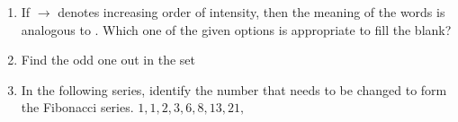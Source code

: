 \documentclass[journal]{IEEEtran}
\begin{document}
\begin{enumerate}[leftmargin=0pt]


\item
If $\rightarrow$ denotes increasing order of intensity, then the meaning of the words   is analogous to . 
Which one of the given options is appropriate to fill the blank?

\vspace{2mm}

\begin{enumerate}
\end{enumerate}

\hfill{}

\vspace{4mm}

\item
Find the odd one out in the set  

\vspace{2mm}

\begin{enumerate}
\end{enumerate}

\hfill{}

\vspace{4mm}

\item
In the following series, identify the number that needs to be changed to form the Fibonacci series.
$1, 1, 2, 3, 6, 8, 13, 21,$ 

\vspace{2mm}

\begin{enumerate}
\end{enumerate}


\end{enumerate}
\end{document}
